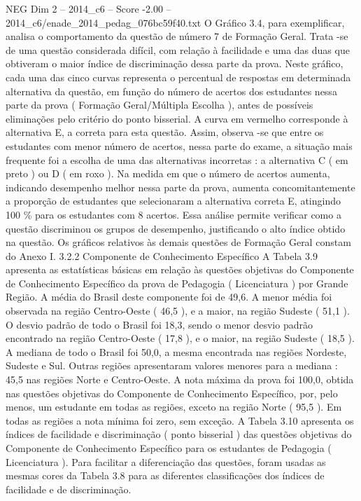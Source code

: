 \begin{textsample}{NEG Dim 2 – 2014\_c6 – Score -2.00 – 2014\_c6/enade\_2014\_pedag\_076bc59f40.txt}
O Gráfico 3.4, para exemplificar, analisa o comportamento da questão de número 7 de Formação Geral.
Trata -se de uma questão considerada difícil, com relação à facilidade e uma das duas que obtiveram o maior índice de discriminação dessa parte da prova.
Neste gráfico, cada uma das cinco curvas representa o percentual de respostas em determinada alternativa da questão, em função do número de acertos dos estudantes nessa parte da prova ( Formação Geral/Múltipla Escolha ), antes de possíveis eliminações pelo critério do ponto bisserial.
A curva em vermelho corresponde à alternativa E, a correta para esta questão.
Assim, observa -se que entre os estudantes com menor número de acertos, nessa parte do exame, a situação mais frequente foi a escolha de uma das alternativas incorretas : a alternativa C ( em preto ) ou D ( em roxo ).
Na medida em que o número de acertos aumenta, indicando desempenho melhor nessa parte da prova, aumenta concomitantemente a proporção de estudantes que selecionaram a alternativa correta E, atingindo 100 \% para os estudantes com 8 acertos.
Essa análise permite verificar como a questão discriminou os grupos de desempenho, justificando o alto índice obtido na questão.
Os gráficos relativos às demais questões de Formação Geral constam do Anexo I. 3.2.2 Componente de Conhecimento Específico A Tabela 3.9 apresenta as estatísticas básicas em relação às questões objetivas do Componente de Conhecimento Específico da prova de Pedagogia ( Licenciatura ) por Grande Região.
A média do Brasil deste componente foi de 49,6.
A menor média foi observada na região Centro-Oeste ( 46,5 ), e a maior, na região Sudeste ( 51,1 ).
O desvio padrão de todo o Brasil foi 18,3, sendo o menor desvio padrão encontrado na região Centro-Oeste ( 17,8 ), e o maior, na região Sudeste ( 18,5 ).
A mediana de todo o Brasil foi 50,0, a mesma encontrada nas regiões Nordeste, Sudeste e Sul.
Outras regiões apresentaram valores menores para a mediana : 45,5 nas regiões Norte e Centro-Oeste.
A nota máxima da prova foi 100,0, obtida nas questões objetivas do Componente de Conhecimento Específico, por, pelo menos, um estudante em todas as regiões, exceto na região Norte ( 95,5 ).
Em todas as regiões a nota mínima foi zero, sem exceção.
A Tabela 3.10 apresenta os índices de facilidade e discriminação ( ponto bisserial ) das questões objetivas do Componente de Conhecimento Específico para os estudantes de Pedagogia ( Licenciatura ).
Para facilitar a diferenciação das questões, foram usadas as mesmas cores da Tabela 3.8 para as diferentes classificações dos índices de facilidade e de discriminação.

\end{textsample}
